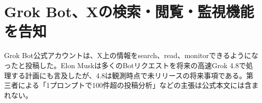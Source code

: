 \section{Grok Bot、Xの検索・閲覧・監視機能を告知}
Grok Bot公式アカウントは、X上の情報をsearch、read、monitorできるようになったと投稿した。Elon Muskは多くのBotリクエストを将来の高速Grok 4.8で処理する計画にも言及したが、4.8は観測時点で未リリースの将来事項である。第三者による「1プロンプトで100件超の投稿分析」などの主張は公式本文には含まれない。
